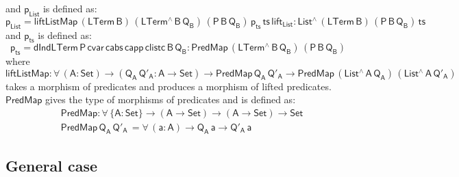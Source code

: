\documentclass[9pt]{entcs} \usepackage{entcsmacro}
\begin{document}
and $\mathsf{p_{List}}$ is defined as:
\[
  \mathsf{p_{List} = liftListMap \, (LTerm\, B) \, (LTerm^{\wedge} \, B \, Q_B)\, 
    (P\,B\,Q_B)\, p_{ts} \, ts\, lift_{List}  : List^{\wedge}\, (LTerm\,B) \, (P\,B\,Q_B) \, ts}
\]
and $\mathsf{p_{ts}}$ is defined as:
\[
\mathsf{
  p_{ts} = dIndLTerm\, P\, cvar\, cabs\, capp\, clistc\, B\, Q_B :  PredMap \,(LTerm^{\wedge}\, B\, Q_B) \, (P\,B\,Q_B)
  }
\]
where 
\[
\mathsf{liftListMap : \forall\, (A : Set) \to (Q_A \, Q'_A : A \to Set) 
  \to PredMap\,Q_A\,Q'_A \to PredMap \,(List^{\wedge}\, A\, Q_A)\, (List^{\wedge}\, A\, Q'_A)}
\]
takes a morphism of predicates and produces a morphism of lifted predicates. 
$\mathsf{PredMap}$ gives the type of morphisms of predicates and is defined as: 
\begin{align*}
  &\mathsf{PredMap : \forall\, \{A : Set\} \to (A \to Set) \to (A \to Set) \to Set } \\
  &\mathsf{PredMap \, Q_A\,Q'_A\, = \forall\, (a : A) \to Q_A\,a \to Q'_A\,a}
\end{align*}



\subsection{General case}

\end{document}
